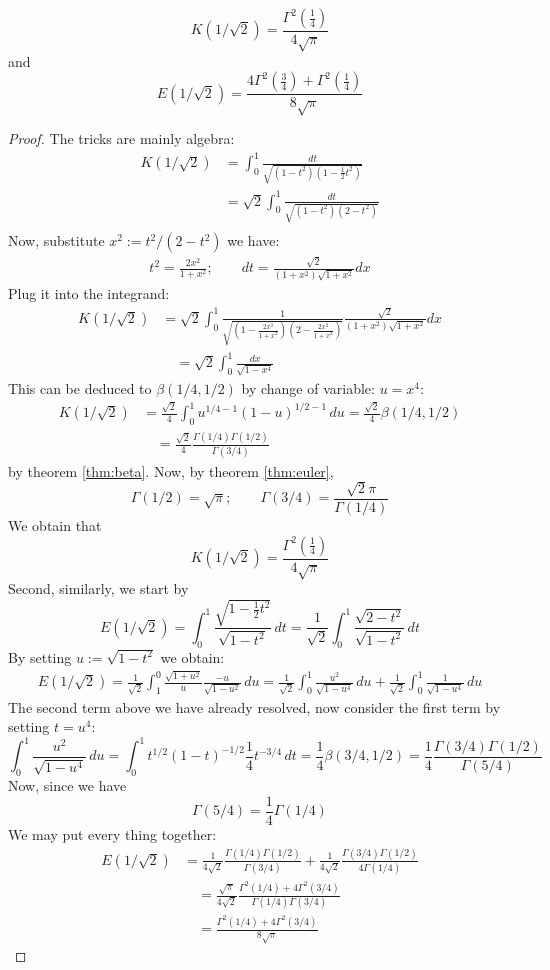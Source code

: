 \documentclass{report}
\begin{document}
\begin{titlepage}
\begin{lemma}\label{thm:lemma 1}
\[
K(1/\sqrt2)=\frac{\Gamma^2(\frac{1}{4})}{4\sqrt{\pi}}
\]
and
\[
E(1/\sqrt2)=\frac{4\Gamma^2(\frac{3}{4})+\Gamma^2(\frac{1}{4})}{8\sqrt{\pi}}
\]
\end{lemma}
\begin{proof}\cite{Borwein:1987aa}
The tricks are mainly algebra:
\begin{align*}
K(1/\sqrt2)&=\int_0^1\frac{dt}{\sqrt{(1-t^2)(1-\frac{1}{2}t^2)}}\\
&=\sqrt2\int_0^1\frac{dt}{\sqrt{(1-t^2)(2-t^2)}}\\
\end{align*}
Now, substitute $x^2:=t^2/(2-t^2)$ we have:
\begin{align*}
t^2=\frac{2x^2}{1+x^2};\qquad dt=\frac{\sqrt2}{(1+x^2)\sqrt{1+x^2}}dx
\end{align*}
Plug it into the integrand:
\begin{align*}
K(1/\sqrt2)&=\sqrt2\int_0^1\frac{1}{\sqrt{(1-\frac{2x^2}{1+x^2})(2-\frac{2x^2}{1+x^2})}}\frac{\sqrt2}{(1+x^2)\sqrt{1+x^2}}dx\\
&\quad=\sqrt2\int_0^1\frac{dx}{\sqrt{1-x^4}}
\end{align*}
This can be deduced to $\beta(1/4,1/2)$ by change of variable: $u=x^4$:
\begin{align*}
K(1/\sqrt2)&=\frac{\sqrt2}{4}\int_0^1u^{1/4-1}(1-u)^{1/2-1}\,du=\frac{\sqrt2}{4}\beta(1/4,1/2)\\
&\quad=\frac{\sqrt2}{4}\frac{\Gamma(1/4)\Gamma(1/2)}{\Gamma{(3/4)}}
\end{align*}
by theorem \ref{thm:beta}. Now, by theorem \ref{thm:euler}, 
\[
\Gamma(1/2)=\sqrt\pi;\qquad\Gamma(3/4)=\frac{\sqrt2\pi}{\Gamma(1/4)}
\]
We obtain that 
\[
K(1/\sqrt2)=\frac{\Gamma^2(\frac{1}{4})}{4\sqrt{\pi}}
\]
Second, similarly, we start by
\[
E(1/\sqrt2)=\int_0^1\frac{\sqrt{1-\frac{1}{2}t^2}}{\sqrt{1-t^2}}\,dt=\frac{1}{\sqrt2}\int_0^1\frac{\sqrt{2-t^2}}{\sqrt{1-t^2}}\,dt
\]
By setting $u:=\sqrt{1-t^2}$ we obtain:
\begin{align*}
E(1/\sqrt2)=\frac{1}{\sqrt{2}}\int_1^0\frac{\sqrt{1+u^2}}{u}\frac{-u}{\sqrt{1-u^2}}\,du=\frac{1}{\sqrt{2}}\int_0^1\frac{u^2}{\sqrt{1-u^4}}\,du+\frac{1}{\sqrt{2}}\int_0^1\frac{1}{\sqrt{1-u^4}}\,du
\end{align*}
The second term above we have already resolved, now consider the first term by setting $t=u^4$:
\[
\int_0^1\frac{u^2}{\sqrt{1-u^4}}\,du=\int_0^1t^{1/2}(1-t)^{-1/2}\frac{1}{4}t^{-3/4}\,dt=\frac{1}{4}\beta(3/4,1/2)=\frac{1}{4}\frac{\Gamma(3/4)\Gamma(1/2)}{\Gamma{(5/4)}}
\]
Now, since we have 
\[
\Gamma(5/4)=\frac{1}{4}\Gamma(1/4)
\]
We may put every thing together:
\begin{align*}
E(1/\sqrt2)&=\frac{1}{4\sqrt2}\frac{\Gamma(1/4)\Gamma(1/2)}{\Gamma{(3/4)}}+
\frac{1}{4\sqrt2}\frac{\Gamma(3/4)\Gamma(1/2)}{4\Gamma{(1/4)}}\\
&\quad=\frac{\sqrt\pi}{4\sqrt2}\frac{\Gamma^2(1/4)+4\Gamma^2(3/4)}{\Gamma{(1/4)}\Gamma{(3/4)}}\\
&\quad=\frac{\Gamma^2(1/4)+4\Gamma^2(3/4)}{8\sqrt\pi}
\end{align*}
\end{proof}


\end{titlepage}
\end{document}
